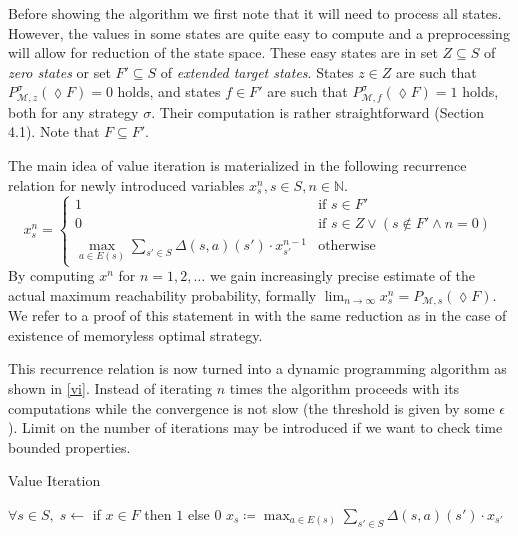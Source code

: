 Before showing the algorithm we first note that it will need to
process all states. However, the values in some states are quite easy to
compute and a preprocessing will allow for reduction of the
state space.
These easy states are in set $Z \subseteq S$
of {\em zero states} or set $F' \subseteq S$ of {\em extended target states}.
States $z \in Z$ are such that $P^\sigma_{\mathcal{M},z}(\lozenge F) = 0$ holds,
and states $f \in F'$ are such that $P^\sigma_{\mathcal{M},f}(\lozenge F) = 1$
holds, both for any strategy $\sigma$.
Their computation is rather straightforward \parencite{forejt} (Section
4.1). Note that $F \subseteq F'$.

The main idea of value iteration is materialized in the following
recurrence relation for newly introduced variables $x_s^n, s \in S, n
\in \mathbb{N}$.
\[
x_s^n =
\begin{cases}
    1 & \text{if }s \in F' \\
    0 & \text{if }s \in Z \lor (s \not \in F' \land n = 0) \\
    \max\limits_{a \in E(s)} \sum\limits_{s' \in S} \Delta(s,a)(s') \cdot x_{s'}^{n-1}
    & \text{otherwise} %
\end{cases}
\]
By computing $x^n$ for $n = 1,2,\ldots$ we gain increasingly precise
estimate of the actual maximum reachability probability,
formally $\lim_{n \to \infty} x^n_s = P_{\mathcal{M},s}(\lozenge F)$.
We refer to a proof of this statement in \parencite{puterman} with the
same reduction as in the case of existence of memoryless optimal
strategy.

This recurrence relation is now turned into a dynamic programming
algorithm as shown in \autoref{vi}. Instead of iterating $n$ times the
algorithm proceeds with its computations while the convergence is not
slow (the threshold is given by some $\epsilon$). Limit on the number of
iterations may be introduced if we want to check time bounded
properties.

\begin{algorithm}
\caption{Value Iteration}
\label{vi}
\begin{algorithmic}
    \State $\forall s \in S,\; s \gets$ if $x \in F$ then $1$ else $0$
    \Do
            \State $x_s \coloneqq
            \max_{a \in E(s)} \sum_{s' \in S} \Delta(s,a)(s') \cdot x_{s'}$
        \EndFor
\end{algorithmic}
\end{algorithm}

